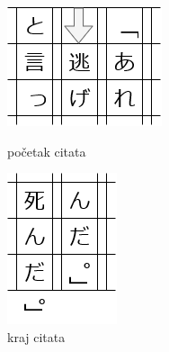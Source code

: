 	\begin{figure}[h]
		\centering
		\begin{minipage}{.45\textwidth}
			\centering
			\includegraphics[width=.6\textwidth]{017_pisanje_res/b1.png}
			\caption{početak citata}
		\end{minipage}
		\begin{minipage}{.45\textwidth}
			\centering
			\includegraphics[width=.48\textwidth]{017_pisanje_res/b2.png}
			\caption{kraj citata}
		\end{minipage}
	\end{figure}

